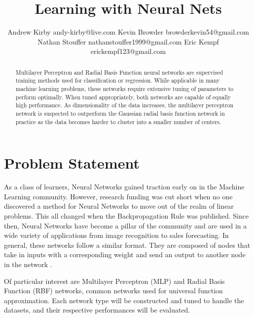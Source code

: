 \documentclass[twoside,10pt]{article}
\begin{document}
\title{Learning with Neural Nets}

\author{\name Andrew Kirby \email andy-kirby@live.com \AND
		\name Kevin Browder \email browderkevin54@gmail.com \AND
		\name Nathan Stouffer \email nathanstouffer1999@gmail.com \AND
		\name Eric Kempf \email erickempf123@gmail.com }

\maketitle

\begin{abstract}
Multilayer Perceptron and Radial Basis Function neural networks are supervised training methods used for classification or regression. While applicable in many machine learning problems, these networks require extensive tuning of parameters to perform optimally. When tuned appropriately, both networks are capable of equally high performance. As dimensionality of the data increases, the multilayer perceptron network is suspected to outperform the Gaussian radial basis function network in practice as the data becomes harder to cluster into a smaller number of centers.
\end{abstract}

\section{Problem Statement}

As a class of learners, Neural Networks gained traction early on in the Machine Learning community.
However, research funding was cut short when no one discovered a method for Neural Networks to move out of the realm of linear problems. This all changed when the Backpropagation Rule was published.
Since then, Neural Networks have become a pillar of the community and are used in a wide variety of applications from image recognition to sales forecasting.
In general, these networks follow a similar format. They are composed of nodes that take in inputs with a corresponding weight and send an output to another node in the network \citep{svozil1997ffnn}.

Of particular interest are Multilayer Perceptron (MLP) and Radial Basis Function (RBF) networks, common networks used for universal function approximation.
Each network type will be constructed and tuned to handle the datasets, and their respective performances will be evaluated.
\end{document}
